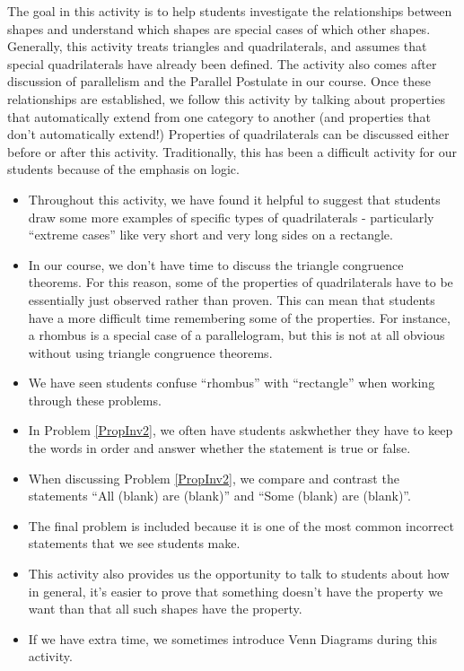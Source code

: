 \documentclass[nooutcomes]{ximera}
\begin{document}
\newpage
\begin{instructorNotes}
The goal in this activity is to help students investigate the relationships between shapes and understand which shapes are special cases of which other shapes.  Generally, this activity treats triangles and quadrilaterals, and assumes that special quadrilaterals have already been defined.  The activity also comes after discussion of parallelism and the Parallel Postulate in our course.  Once these relationships are established, we follow this activity by talking about properties that automatically extend from one category to another (and properties that don't automatically extend!)  Properties of quadrilaterals can be discussed either before or after this activity.  Traditionally, this has been a difficult activity for our students because of the emphasis on logic.



\begin{itemize}
    \item Throughout this activity, we have found it helpful to suggest that students draw some more examples of specific types of quadrilaterals - particularly ``extreme cases'' like very short and very long sides on a rectangle.
    \item In our course, we don't have time to discuss the triangle congruence theorems. For this reason, some of the properties of quadrilaterals have to be essentially just observed rather than proven.  This can mean that students have a more difficult time remembering some of the properties.  For instance, a rhombus is a special case of a parallelogram, but this is not at all obvious without using triangle congruence theorems.
    \item We have seen students confuse ``rhombus'' with ``rectangle'' when working through these problems.
    \item In Problem \ref{PropInv2}, we often have students askwhether they have to keep the words in order and answer whether the statement is true or false.  
    \item When discussing Problem \ref{PropInv2}, we compare and contrast the statements ``All (blank) are (blank)'' and ``Some (blank) are (blank)''.
    \item The final problem is included because it is one of the most common incorrect statements that we see students make.
    \item This activity also provides us the opportunity to talk to students about how in general, it's easier to prove that something doesn't have the property we want than that all such shapes have the property.  
    \item If we have extra time, we sometimes introduce Venn Diagrams during this activity.
\end{itemize}

\end{instructorNotes}
\end{document}
